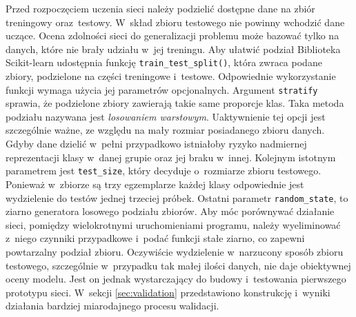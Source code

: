 Przed rozpoczęciem uczenia sieci należy podzielić dostępne dane na zbiór
treningowy oraz~testowy.
W~skład zbioru testowego nie powinny wchodzić dane uczące.
Ocena zdolności sieci do generalizacji problemu może bazować tylko
na danych, które nie brały udziału w~jej treningu.
Aby ułatwić podział Biblioteka Scikit-learn udostępnia funkcję
\texttt{train_test_split()}, która zwraca
podane zbiory, podzielone na części treningowe i~testowe.
Odpowiednie wykorzystanie funkcji wymaga użycia jej parametrów opcjonalnych.
Argument \texttt{stratify} sprawia, że podzielone zbiory
zawierają takie same proporcje klas.
Taka metoda podziału nazywana jest \emph{losowaniem warstowym}.
Uaktywnienie tej opcji jest szczególnie ważne, ze względu na mały rozmiar
posiadanego zbioru danych.
Gdyby dane dzielić w~pełni przypadkowo istniałoby ryzyko nadmiernej
reprezentacji klasy w~danej grupie oraz jej braku w~innej.
Kolejnym istotnym parametrem jest \texttt{test_size}, który
decyduje o~rozmiarze zbioru testowego.
Ponieważ w~zbiorze są trzy egzemplarze każdej klasy odpowiednie jest
wydzielenie do testów jednej trzeciej próbek.
Ostatni parametr \texttt{random_state}, to ziarno generatora
losowego podziału zbiorów.
Aby móc porównywać działanie sieci, pomiędzy wielokrotnymi uruchomieniami
programu, należy wyeliminować z~niego czynniki przypadkowe i~podać
funkcji stałe ziarno, co zapewni powtarzalny podział zbioru.
Oczywiście wydzielenie w~narzucony sposób zbioru testowego, szczególnie
w~przypadku tak małej ilości danych, nie daje obiektywnej oceny modelu.
Jest on jednak wystarczający do budowy i~testowania pierwszego prototypu
sieci.
W~sekcji \ref{sec:validation} przedstawiono konstrukcję i~wyniki działania
bardziej miarodajnego procesu walidacji.

